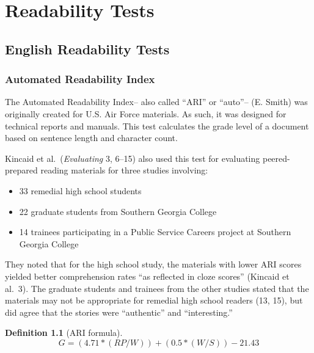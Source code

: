 \documentclass[
]{book}
\providecommand{\tightlist}{%
  \setlength{\itemsep}{0pt}\setlength{\parskip}{0pt}}
\theoremstyle{definition}
\newtheorem{definition}{Definition}[chapter]
\theoremstyle{definition}
\theoremstyle{definition}
\theoremstyle{definition}
\theoremstyle{remark}
\begin{document}
\hypertarget{part-readability-tests}{%
\part{Readability Tests}\label{part-readability-tests}}

\hypertarget{english-readability-tests}{%
\chapter{English Readability Tests}\label{english-readability-tests}}

\hypertarget{ari-test}{%
\section{\texorpdfstring{Automated Readability Index}{Automated Readability Index}}\label{ari-test}}

The Automated Readability Index-- also called ``ARI'' or ``auto''-- (E. Smith) was originally created for U.S. Air Force materials. As such, it was designed for technical reports and manuals. This test calculates the grade level of a document based on sentence length and character count.

Kincaid et al.~(\emph{Evaluating} 3, 6--15) also used this test for evaluating peered-prepared reading materials for three studies involving:

\begin{itemize}
\tightlist
\item
  33 remedial high school students
\item
  22 graduate students from Southern Georgia College
\item
  14 trainees participating in a Public Service Careers project at Southern Georgia College
\end{itemize}

They noted that for the high school study, the materials with lower ARI scores yielded better comprehension rates ``as reflected in cloze scores'' (Kincaid et al.~3). The graduate students and trainees from the other studies stated that the materials may not be appropriate for remedial high school readers (13, 15), but did agree that the stories were ``authentic'' and ``interesting.''

\begin{definition}[ARI formula]
\protect\hypertarget{def:ari}{}{\label{def:ari} {} }\[
G = (4.71 * (RP/W)) + (0.5 * (W/S)) - 21.43
\]
\end{definition}
\end{document}
